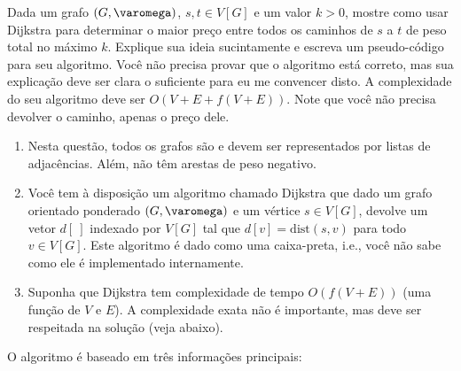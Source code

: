 Dada um grafo $(G, \varomega)$, $s, t \in V[G]$ e um valor $k > 0$, mostre como usar Dijkstra para determinar o maior preço entre todos os caminhos de $s$ a $t$ de peso total no máximo $k$. Explique sua ideia sucintamente e escreva um pseudo-código para seu algoritmo. Você não  precisa provar que o algoritmo está correto, mas sua explicação deve ser clara o suficiente para eu me convencer disto. A complexidade do seu algoritmo deve ser $O(V+E + f(V+E))$. Note que você não precisa devolver o caminho, apenas o preço dele.

\begin{enumerate}[label={(\alph*)}]
    \item Nesta questão, todos os grafos são e devem ser representados por listas de adjacências. Além, não têm arestas de peso negativo.

    \item Você tem à disposição um algoritmo chamado Dijkstra que dado um grafo orientado ponderado $(G, \varomega)$ e um vértice $s \in V[G]$, devolve um vetor $d[~]$ indexado por $V[G]$ tal que $d[v] = \mathrm{dist}(s, v)$ para todo $v \in V[G]$. Este algoritmo é dado como uma caixa-preta, i.e., você não sabe como ele é implementado internamente.

    \item Suponha que Dijkstra tem complexidade de tempo $O(f(V+E))$ (uma função de $V$ e $E$). A complexidade exata não é importante, mas deve ser respeitada na solução (veja abaixo).
\end{enumerate}

\itemdsep

O algoritmo é baseado em três informações principais:

